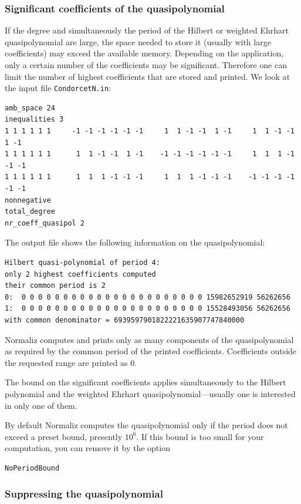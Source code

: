 \subsubsection{Significant coefficients of the quasipolynomial}\label{highest_coeff}

If the degree and simultaneously the period of the Hilbert or weighted Ehrhart quasipolynomial are large, the space needed to store it (usually with large coefficients) may exceed the available memory. Depending on the application, only a certain number of the coefficients may be significant. Therefore one can limit the number of highest coefficients that are stored and printed. We look at the input file \texttt{CondorcetN.in}:
\begin{Verbatim}
amb_space 24
inequalities 3
1 1 1 1 1 1     -1 -1 -1 -1 -1 -1     1  1 -1 -1  1 -1     1  1 -1 -1  1 -1
1 1 1 1 1 1      1  1 -1 -1  1 -1    -1 -1 -1 -1 -1 -1     1  1  1 -1 -1 -1
1 1 1 1 1 1      1  1  1 -1 -1 -1     1  1  1 -1 -1 -1    -1 -1 -1 -1 -1 -1
nonnegative
total_degree
nr_coeff_quasipol 2
\end{Verbatim}

The output file shows the following information on the quasipolynomial:
\begin{Verbatim}
Hilbert quasi-polynomial of period 4:
only 2 highest coefficients computed
their common period is 2
0:  0 0 0 0 0 0 0 0 0 0 0 0 0 0 0 0 0 0 0 0 0 0 15982652919 56262656
1:  0 0 0 0 0 0 0 0 0 0 0 0 0 0 0 0 0 0 0 0 0 0 15528493056 56262656
with common denominator = 6939597901822221635907747840000
\end{Verbatim}
Normaliz computes and prints only as many components of the quasipolynomial as required by the common period of the printed coefficients. Coefficients outside the requested range are printed as $0$.

The bound on the significant coefficients applies simultaneously to the Hilbert polynomial and the weighted Ehrhart quasipolynomial---usually one is interested in only one of them.

By default Normaliz computes the quasipolynomial only if the period does not exceed a preset bound, presently $10^6$. If this bound is too small for your computation, you can remove it by the option
\begin{Verbatim}
NoPeriodBound
\end{Verbatim}

\subsubsection{Suppressing the quasipolynomial}

